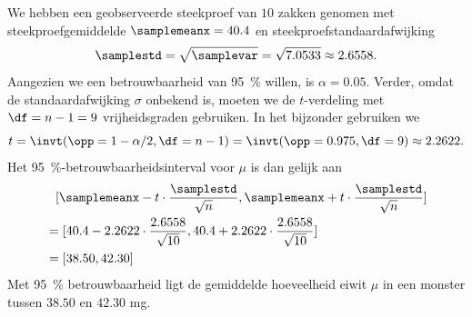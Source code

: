 \begin{enumerate}[label=(\alph*)]
{        We hebben een geobserveerde steekproef van $10$ zakken genomen met steekproefgemiddelde $\samplemeanx = 40.4$ en steekproefstandaardafwijking 
        \[
            \samplestd = \sqrt{\samplevar} = \sqrt{7.0533} \approx 2.6558.
        \] 
        Aangezien we een betrouwbaarheid van \SI{95}{\percent} willen, is $\alpha = 0.05$.
        Verder, omdat de standaardafwijking $\sigma$ onbekend is, moeten we de $t$-verdeling met $\df=n-1=9$ vrijheidsgraden gebruiken.
        In het bijzonder gebruiken we
        \[
            t = \invt(\opp=1-\alpha/2, \df=n-1) = \invt(\opp=0.975, \df=9) \approx 2.2622.
        \]
        Het \SI{95}{\percent}-betrouwbaarheidsinterval voor $\mu$ is dan gelijk aan 
        \begin{align*}
            &\phantom{=}[\samplemeanx - t \cdot \frac{\samplestd}{\sqrt{n}}, \samplemeanx + t \cdot \frac{\samplestd}{\sqrt{n}}] \\
            &=[40.4 - 2.2622 \cdot \frac{2.6558}{\sqrt{10}}, 40.4 + 2.2622 \cdot \frac{2.6558}{\sqrt{10}}] \\
            &=[38.50, 42.30]
        \end{align*}
        Met \SI{95}{\percent} betrouwbaarheid ligt de gemiddelde hoeveelheid eiwit $\mu$ in een monster tussen $38.50$ en $42.30$ \unit{mg}.
    }
\end{enumerate}
